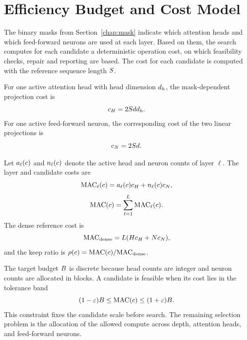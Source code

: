 \section{Efficiency Budget and Cost Model}
\label{chap:cost}

The binary masks from Section~\ref{chap:mask} indicate which attention heads and which feed-forward neurons are used at each layer. Based on them, the search computes for each candidate a deterministic operation cost, on which feasibility checks, repair and reporting are based. The cost for each candidate is computed with the reference sequence length $S$.

For one active attention head with head dimension $d_{h}$, the mask-dependent projection cost is
\begin{equation}
c_{H} = 2 S d d_{h} .
\label{eq:hcost}
\end{equation}
For one active feed-forward neuron, the corresponding cost of the two linear projections is
\begin{equation}
c_{N} = 2 S d .
\label{eq:ncost}
\end{equation}

Let $a_{\ell}(c)$ and $n_{\ell}(c)$ denote the active head and neuron counts of layer $\ell$. The layer and candidate costs are
\begin{equation}
\mathrm{MAC}_\ell(c)
=
a_{\ell}(c)c_{H}+n_{\ell}(c)c_{N} ,
\label{eq:layercost}
\end{equation}
\begin{equation}
\mathrm{MAC}(c)
=
\sum_{\ell=1}^{L}\mathrm{MAC}_\ell(c).
\label{eq:candcost}
\end{equation}
The dense reference cost is
\[
\mathrm{MAC}_{\mathrm{dense}}=L(Hc_{H}+Nc_{N}),
\]
and the keep ratio is $\rho(c)=\mathrm{MAC}(c)/\mathrm{MAC}_{\mathrm{dense}}$.

The target budget $B$ is discrete because head counts are integer and neuron counts are allocated in blocks. A candidate is feasible when its cost lies in the tolerance band
\begin{equation}
(1-\varepsilon)B
\le
\mathrm{MAC}(c)
\le
(1+\varepsilon)B .
\label{eq:band}
\end{equation}
This constraint fixes the candidate scale before search. The remaining selection problem is the allocation of the allowed compute across depth, attention heads, and feed-forward neurons.

